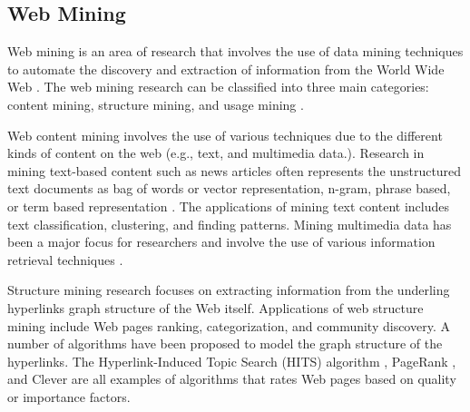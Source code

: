 \subsection{Web Mining}
Web mining is an area of research that involves the use of data mining techniques to automate the discovery and extraction of information from the World Wide Web \cite{etzioni_1996_Communication_ACM}.
The web mining research can be classified into three main categories: content mining, structure mining, and usage mining \cite{madria_1999_Springer,kosala_2000_Survey}.

Web content mining involves the use of various techniques due to the different kinds of content on the web (e.g., text, and multimedia data.).
Research in mining text-based content such as news articles often represents the unstructured text documents as bag of words or vector representation, n-gram, phrase based, or term based representation \cite{manning_2008_intro_to_IR}.
The applications of mining text content includes text classification, clustering, and finding patterns.
Mining multimedia data has been a major focus for researchers  and involve the use of various information retrieval techniques \cite{Wang_2011_SIGIR, Wu_2011_WSDM}.

Structure mining research focuses on extracting information from the underling hyperlinks graph structure of the Web itself.
Applications of web structure mining include Web pages ranking, categorization, and community discovery.
A number of algorithms have been proposed to model the graph structure of the hyperlinks.
The Hyperlink-Induced Topic Search (HITS) algorithm \cite{Kleinberg_1999_JACM}, PageRank \cite{Brin_1998_PageRank}, and Clever \cite{chakrabarti_1999_Computer} are all examples of algorithms that rates Web pages based on quality or importance factors. 
